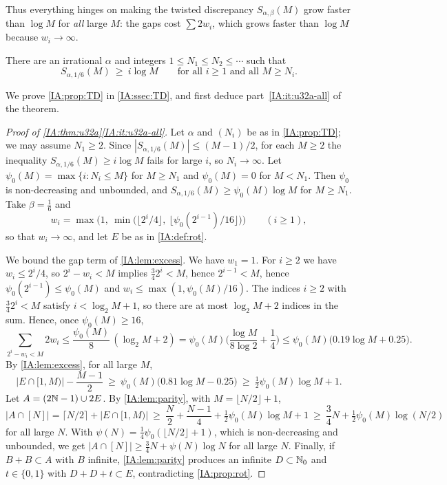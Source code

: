 Thus everything hinges on making the twisted discrepancy $S_{\alpha,\beta}(M)$ grow faster than
$\log M$ for \emph{all} large $M$: the gaps cost $\sum 2w_i$, which grows faster than $\log M$
because $w_i\to\infty$.

\begin{proposition}\label{IA:prop:TD}
There are an irrational $\alpha$ and integers $1\le N_1\le N_2\le\cdots$ such that
\[
S_{\alpha,1/6}(M)\ \ge\ i\log M\qquad\text{for all } i\ge1 \text{ and all } M\ge N_i .
\]
\end{proposition}

We prove \cref{IA:prop:TD} in \cref{IA:ssec:TD}, and first deduce part~\ref{IA:it:u32a-all} of the
theorem.

\begin{proof}[Proof of \cref{IA:thm:u32a}\ref{IA:it:u32a-all}]
Let $\alpha$ and $(N_i)$ be as in \cref{IA:prop:TD}; we may assume $N_1\ge2$. Since
$|S_{\alpha,1/6}(M)|\le(M-1)/2$, for each $M\ge2$ the inequality $S_{\alpha,1/6}(M)\ge i\log M$ fails for large
$i$, so $N_i\to\infty$. Let $\psi_0(M)=\max\{i:N_i\le M\}$ for $M\ge N_1$ and $\psi_0(M)=0$ for
$M<N_1$. Then $\psi_0$ is non-decreasing and unbounded, and
$S_{\alpha,1/6}(M)\ge\psi_0(M)\log M$ for $M\ge N_1$. Take $\beta=\frac16$ and
\[
w_i=\max\Big(1,\ \min\big(\lfloor 2^i/4\rfloor,\ \lfloor\psi_0(2^{i-1})/16\rfloor\big)\Big)\qquad(i\ge1),
\]
so that $w_i\to\infty$, and let $E$ be as in \cref{IA:def:rot}.

We bound the gap term of \cref{IA:lem:excess}. We have $w_1=1$. For $i\ge2$ we have $w_i\le2^i/4$, so
$2^i-w_i<M$ implies $\frac34 2^i<M$, hence $2^{i-1}<M$, hence $\psi_0(2^{i-1})\le\psi_0(M)$ and
$w_i\le\max(1,\psi_0(M)/16)$. The indices $i\ge 2$ with $\frac342^i<M$ satisfy
$i<\log_2M+1$, so there are at most $\log_2M+2$ indices in the sum. Hence, once $\psi_0(M)\ge16$,
\[
\sum_{2^i-w_i<M}2w_i\le\frac{\psi_0(M)}{8}\,(\log_2M+2)=\psi_0(M)\Big(\frac{\log M}{8\log 2}+\frac14\Big)
\le\psi_0(M)\big(0.19\log M+0.25\big).
\]
By \cref{IA:lem:excess}, for all large $M$,
\[
|E\cap[1,M)|-\frac{M-1}2\ \ge\ \psi_0(M)\big(0.81\log M-0.25\big)\ \ge\ \tfrac12\psi_0(M)\log M+1 .
\]
Let $A=(2\mathbb{N}-1)\cup2E$. By \cref{IA:lem:parity}, with $M=\lfloor N/2\rfloor+1$,
\[
|A\cap[N]|=\lceil N/2\rceil+|E\cap[1,M)|\ \ge\ \frac N2+\frac{N-1}4+\tfrac12\psi_0(M)\log M+1
\ \ge\ \frac34N+\tfrac12\psi_0(M)\log(N/2)
\]
for all large $N$. With $\psi(N)=\frac14\psi_0(\lfloor N/2\rfloor+1)$, which is non-decreasing and
unbounded, we get $|A\cap[N]|\ge\frac34N+\psi(N)\log N$ for all large $N$. Finally, if $B+B\subset A$
with $B$ infinite, \cref{IA:lem:parity} produces an infinite $D\subset\mathbb{N}_0$ and $t\in\{0,1\}$ with
$D+D+t\subset E$, contradicting \cref{IA:prop:rot}.
\end{proof}


